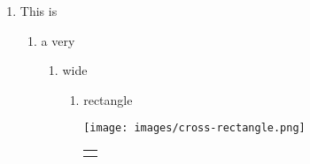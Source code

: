 \documentclass[10pt,]{article}
\theoremstyle{plain}
\theoremstyle{definition}
\theoremstyle{definition}
\theoremstyle{definition}
\theoremstyle{definition}
\theoremstyle{definition}
\theoremstyle{definition}
\numberwithin{equation}{section}
\newlength{\panelmax}
\begin{document}
\begin{enumerate}
\item\hypertarget{li-246}{}\hypertarget{p-697}{}%
This is%
\begin{enumerate}
\item\hypertarget{li-247}{}\hypertarget{p-698}{}%
a very%
\begin{enumerate}
\item\hypertarget{li-248}{}\hypertarget{p-699}{}%
wide%
\begin{enumerate}
\item\hypertarget{li-249}{}\hypertarget{p-700}{}%
rectangle%
{%
\setlength{\panelmax}{0pt}
\ifdefined\panelboxAimage\else\newsavebox{\panelboxAimage}\fi%
\begin{lrbox}{\panelboxAimage}
\texttt{[image: images/cross-rectangle.png]}
\end{lrbox}
\ifdefined\phAimage\else\newlength{\phAimage}\fi%
\setlength{\phAimage}{\ht\panelboxAimage+\dp\panelboxAimage}
\settototalheight{\phAimage}{\usebox{\panelboxAimage}}
\setlength{\panelmax}{\maxof{\panelmax}{\phAimage}}
\leavevmode%
\setlength{\tabcolsep}{0\linewidth}
\par\medskip\noindent
\begin{tabular}{@{}*{1}{c}@{}}
\begin{minipage}[c][\panelmax][t]{1\linewidth}\usebox{\panelboxAimage}\end{minipage}\end{tabular}\\
}%
\end{enumerate}
%
\end{enumerate}
%
\end{enumerate}
%
\end{enumerate}
%
\typeout{************************************************}
\typeout{************************************************}
\end{document}

